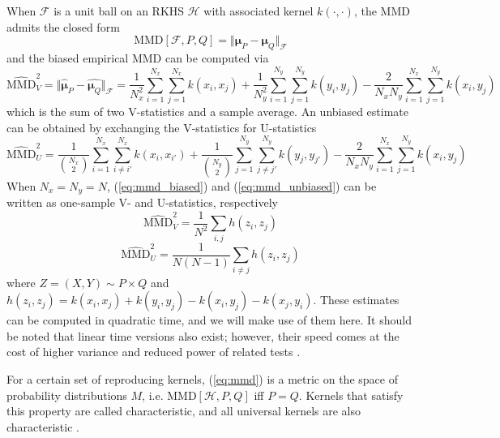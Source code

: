 \documentclass[a4paper,11pt]{article}
\begin{document}
When $\mathcal{F}$ is a unit ball on an RKHS $\mathcal{H}$ with associated kernel $k(\cdot, \cdot)$, the MMD admits the closed form
\begin{equation}
        \mathrm{MMD}[\mathcal{F}, P, Q] = \Vert \mathbf{\mu}_{P}-\mathbf{\mu}_{Q} \Vert_{\mathcal{F}}
    \label{eq:mmd_closed}
\end{equation}
and the biased empirical MMD can be computed via
\begin{equation}
        \widehat{\mathrm{MMD}}_{V}^{2} = \Vert \hat{\mathbf{\mu}}_{P}-\hat{\mathbf{\mu}_{Q}} \Vert_{\mathcal{F}} = \frac{1}{N_{x}^{2}} \sum_{i=1}^{N_{x}} \sum_{j=1}^{N_{x}} k\left(x_{i}, x_{j}\right)+\frac{1}{N_{y}^{2}} \sum_{i=1}^{N_{y}} \sum_{j=1}^{N_{y}} k\left(y_{i}, y_{j}\right)
        -\frac{2}{N_{x} N_{y}} \sum_{i=1}^{N_{x}} \sum_{j=1}^{N_{y}} k\left(x_{i}, y_{j}\right)
        \label{eq:mmd_biased}
\end{equation}
which is the sum of two V-statistics and a sample average. An unbiased estimate can be obtained by exchanging the V-statistics for U-statistics
\begin{equation}
    \widehat{\mathrm{MMD}}_{U}^{2} = \frac{1}{{N_{x}\choose 2}} \sum_{i = 1}^{N_{x}} \sum_{i \neq i'}^{N_{x}} k\left(x_{i}, x_{i'}\right)+\frac{1}{{N_{y}\choose 2}} \sum_{j = 1}^{N_{y}} \sum_{j \neq j'}^{N_{y}} k\left(y_{j}, y_{j'}\right)-\frac{2}{N_{x}N_{y}} \sum_{i = 1}^{N_{x}} \sum_{j = 1}^{N_{y}} k\left(x_{i}, y_{j}\right)
    \label{eq:mmd_unbiased}
\end{equation}
When $N_{x}=N_{y}=N$, (\ref{eq:mmd_biased}) and (\ref{eq:mmd_unbiased}) can be written as one-sample V- and U-statistics, respectively
\begin{equation}
    \widehat{\mathrm{MMD}}_{V}^{2} = \frac{1}{N^{2}} \sum_{i, j} h(z_{i}, z_{j})
    \label{eq:mmd_biased_v}
\end{equation}
\begin{equation}
    \widehat{\mathrm{MMD}}_{U}^{2} = \frac{1}{N(N-1)} \sum_{i \neq j} h(z_{i}, z_{j})
    \label{eq:mmd_unbiased_u}
\end{equation}
where $Z = (X, Y) \sim P \times Q$ and $h(z_{i}, z_{j})=k(x_{i}, x_{j}) + k(y_{i}, y_{j}) - k(x_{i}, y_{j}) - k(x_{j}, y_{i})$. These estimates can be computed in quadratic time, and we will make use of them here. It should be noted that linear time versions also exist; however, their speed comes at the cost of higher variance and reduced power of related tests \cite{gretton_kernel_2012}.

For a certain set of reproducing kernels, (\ref{eq:mmd}) is a metric on the space of probability distributions $M$, i.e. $\mathrm{MMD}[\mathcal{H}, P, Q]$ iff $P=Q$. Kernels that satisfy this property are called characteristic, and all universal kernels are also characteristic \cite{sriperumbudur_hilbert_2010}.
\end{document}
